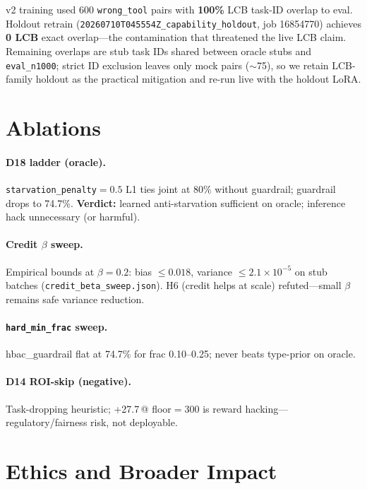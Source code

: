 \documentclass[11pt,letterpaper]{article}
\newcommand{\pp}{\,\text{pp}}
\begin{document}
v2 training used 600 \texttt{wrong\_tool} pairs with \textbf{100\%} LCB task-ID overlap to eval.
Holdout retrain (\texttt{20260710T045554Z\_capability\_holdout}, job 16854770) achieves \textbf{0 LCB} exact overlap---the contamination that threatened the live LCB claim.
Remaining overlaps are stub task IDs shared between oracle stubs and \texttt{eval\_n1000}; strict ID exclusion leaves only mock pairs ($\sim$75), so we retain LCB-family holdout as the practical mitigation and re-run live with the holdout LoRA.

\section{Ablations}
\label{sec:ablation}

\paragraph{D18 ladder (oracle).}
\texttt{starvation\_penalty}${=}0.5$ L1 ties joint at 80\% without guardrail; guardrail drops to 74.7\%.
\textbf{Verdict:} learned anti-starvation sufficient on oracle; inference hack unnecessary (or harmful).

\paragraph{Credit $\beta$ sweep.}
Empirical bounds at $\beta{=}0.2$: bias $\le 0.018$, variance $\le 2.1{\times}10^{-5}$ on stub batches (\texttt{credit\_beta\_sweep.json}).
H6 (credit helps at scale) refuted---small $\beta$ remains safe variance reduction.

\paragraph{\texttt{hard\_min\_frac} sweep.}
hbac\_guardrail flat at 74.7\% for frac 0.10--0.25; never beats type-prior on oracle.

\paragraph{D14 ROI-skip (negative).}
Task-dropping heuristic; +27.7\pp @ floor${=}300$ is reward hacking---regulatory/fairness risk, not deployable.

\section{Ethics and Broader Impact}
\label{sec:ethics}
\end{document}
